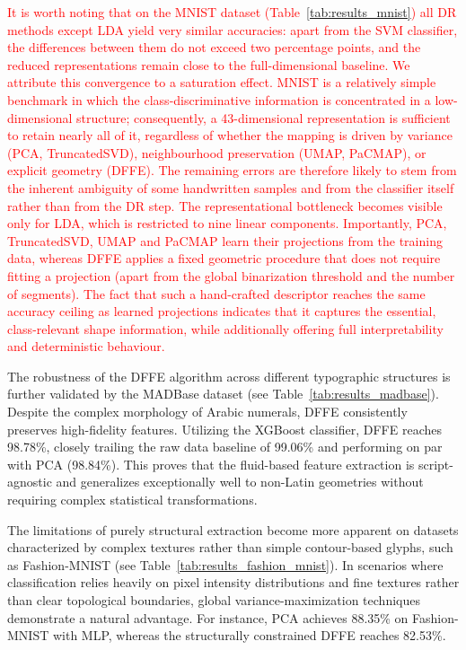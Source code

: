 \documentclass[a4paper,fleqn]{cas-dc}
\begin{document}
\textcolor{red}{It is worth noting that on the MNIST dataset (Table~\ref{tab:results_mnist}) all DR methods except LDA yield very similar accuracies: apart from the SVM classifier, the differences between them do not exceed two percentage points, and the reduced representations remain close to the full-dimensional baseline. We attribute this convergence to a saturation effect. MNIST is a relatively simple benchmark in which the class-discriminative information is concentrated in a low-dimensional structure; consequently, a 43-dimensional representation is sufficient to retain nearly all of it, regardless of whether the mapping is driven by variance (PCA, TruncatedSVD), neighbourhood preservation (UMAP, PaCMAP), or explicit geometry (DFFE). The remaining errors are therefore likely to stem from the inherent ambiguity of some handwritten samples and from the classifier itself rather than from the DR step. The representational bottleneck becomes visible only for LDA, which is restricted to nine linear components. Importantly, PCA, TruncatedSVD, UMAP and PaCMAP learn their projections from the training data, whereas DFFE applies a fixed geometric procedure that does not require fitting a projection (apart from the global binarization threshold and the number of segments). The fact that such a hand-crafted descriptor reaches the same accuracy ceiling as learned projections indicates that it captures the essential, class-relevant shape information, while additionally offering full interpretability and deterministic behaviour.}

The robustness of the DFFE algorithm across different typographic structures is further validated by the MADBase dataset (see Table~\ref{tab:results_madbase}). Despite the complex morphology of Arabic numerals, DFFE consistently preserves high-fidelity features. Utilizing the XGBoost classifier, DFFE reaches 98.78\%, closely trailing the raw data baseline of 99.06\% and performing on par with PCA (98.84\%). This proves that the fluid-based feature extraction is script-agnostic and generalizes exceptionally well to non-Latin geometries without requiring complex statistical transformations.

The limitations of purely structural extraction become more apparent on datasets characterized by complex textures rather than simple contour-based glyphs, such as Fashion-MNIST (see Table~\ref{tab:results_fashion_mnist}). In scenarios where classification relies heavily on pixel intensity distributions and fine textures rather than clear topological boundaries, global variance-maximization techniques demonstrate a natural advantage. For instance, PCA achieves 88.35\% on Fashion-MNIST with MLP, whereas the structurally constrained DFFE reaches 82.53\%. 
\end{document}
